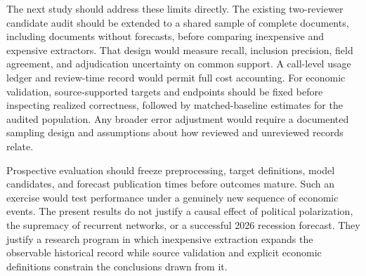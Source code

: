 The next study should address these limits directly. The existing two-reviewer candidate audit should be extended to a shared sample of complete documents, including documents without forecasts, before comparing inexpensive and expensive extractors. That design would measure recall, inclusion precision, field agreement, and adjudication uncertainty on common support. A call-level usage ledger and review-time record would permit full cost accounting. For economic validation, source-supported targets and endpoints should be fixed before inspecting realized correctness, followed by matched-baseline estimates for the audited population. Any broader error adjustment would require a documented sampling design and assumptions about how reviewed and unreviewed records relate.

Prospective evaluation should freeze preprocessing, target definitions, model candidates, and forecast publication times before outcomes mature. Such an exercise would test performance under a genuinely new sequence of economic events. The present results do not justify a causal effect of political polarization, the supremacy of recurrent networks, or a successful 2026 recession forecast. They justify a research program in which inexpensive extraction expands the observable historical record while source validation and explicit economic definitions constrain the conclusions drawn from it.

